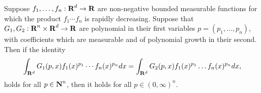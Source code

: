 

\begin{lemma}\label{densitycor}
Suppose $f_{1},\hdots,f_{n}:{\hbox{\bf R}}^d\rightarrow {\hbox{\bf R}}$ are non-negative
bounded measurable functions for which the product $f_{1}\cdots
f_{n}$ is rapidly decreasing. Suppose that $G_{1},G_{2}:{\hbox{\bf R}}^{n}
\times{\hbox{\bf R}}^{d}\rightarrow{\hbox{\bf R}}$ are polynomial in their first variables
$p=(p_1,\hdots,p_n)$, with coefficients which are measurable and
of polynomial growth in their second. Then if the identity
$$
\int_{{\bf R}^{d}}G_{1}(p,x)f_{1}(x)^{p_{1}}\cdots f_n(x)^{p_n}dx=
\int_{{\bf R}^{d}}G_{2}(p,x)f_1(x)^{p_1}\hdots f_n(x)^{p_n}dx,
$$
holds for all $p\in {\hbox{\bf N}}^n$, then it holds for all $p\in
(0,\infty)^{n}$.
\end{lemma}

